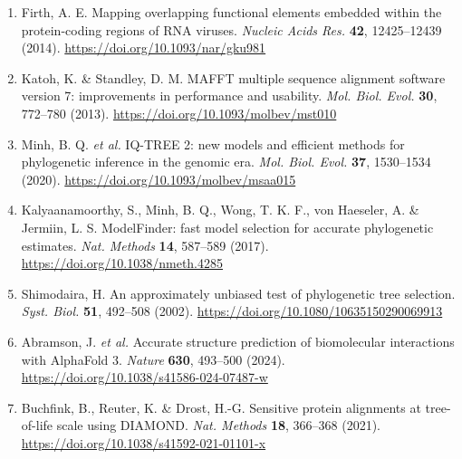 \documentclass[10pt,letterpaper]{article}
\begin{document}
{\begin{enumerate}[leftmargin=1.9em,itemsep=-0.6pt,parsep=0pt,topsep=0.5pt]
  \item Firth, A. E. Mapping overlapping functional elements embedded within the protein-coding regions of RNA viruses. \textit{Nucleic Acids Res.} \textbf{42}, 12425--12439 (2014). \url{https://doi.org/10.1093/nar/gku981}
  \item Katoh, K. \& Standley, D. M. MAFFT multiple sequence alignment software version 7: improvements in performance and usability. \textit{Mol. Biol. Evol.} \textbf{30}, 772--780 (2013). \url{https://doi.org/10.1093/molbev/mst010}
  \item Minh, B. Q. \textit{et al.} IQ-TREE 2: new models and efficient methods for phylogenetic inference in the genomic era. \textit{Mol. Biol. Evol.} \textbf{37}, 1530--1534 (2020). \url{https://doi.org/10.1093/molbev/msaa015}
  \item Kalyaanamoorthy, S., Minh, B. Q., Wong, T. K. F., von Haeseler, A. \& Jermiin, L. S. ModelFinder: fast model selection for accurate phylogenetic estimates. \textit{Nat. Methods} \textbf{14}, 587--589 (2017). \url{https://doi.org/10.1038/nmeth.4285}
  \item Shimodaira, H. An approximately unbiased test of phylogenetic tree selection. \textit{Syst. Biol.} \textbf{51}, 492--508 (2002). \url{https://doi.org/10.1080/10635150290069913}
  \item Abramson, J. \textit{et al.} Accurate structure prediction of biomolecular interactions with AlphaFold 3. \textit{Nature} \textbf{630}, 493--500 (2024). \url{https://doi.org/10.1038/s41586-024-07487-w}
  \item Buchfink, B., Reuter, K. \& Drost, H.-G. Sensitive protein alignments at tree-of-life scale using DIAMOND. \textit{Nat. Methods} \textbf{18}, 366--368 (2021). \url{https://doi.org/10.1038/s41592-021-01101-x}
\end{enumerate}
}
\end{document}
